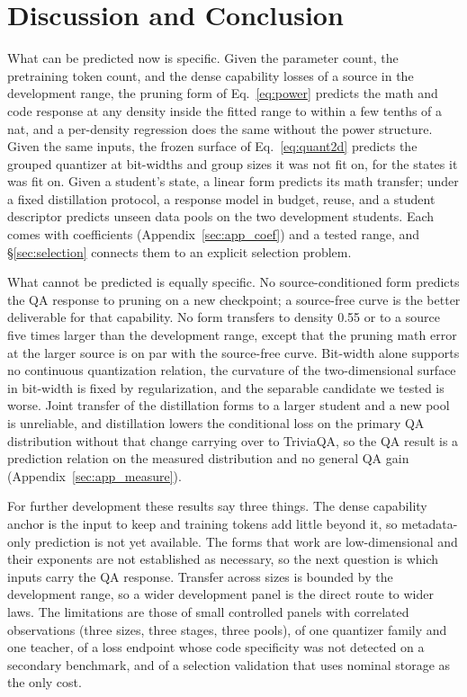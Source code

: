 \section{Discussion and Conclusion}
\label{sec:discussion}

What can be predicted now is specific. Given the parameter count, the
pretraining token count, and the dense capability losses of a source
in the development range, the pruning form of Eq.~\eqref{eq:power}
predicts the math and code response at any density inside the fitted
range to within a few tenths of a nat, and a per-density regression
does the same without the power structure. Given the same inputs, the
frozen surface of Eq.~\eqref{eq:quant2d} predicts the grouped
quantizer at bit-widths and group sizes it was not fit on, for the
states it was fit on. Given a student's state, a linear form predicts
its math transfer; under a fixed distillation protocol, a response
model in budget, reuse, and a student descriptor predicts unseen data
pools on the two development students. Each comes with coefficients
(Appendix~\ref{sec:app_coef}) and a tested range, and
\S\ref{sec:selection} connects them to an explicit selection problem.

What cannot be predicted is equally specific. No source-conditioned
form predicts the QA response to pruning on a new checkpoint; a
source-free curve is the better deliverable for that capability. No
form transfers to density 0.55 or to a source five times larger than
the development range, except that the pruning math error at the
larger source is on par with the source-free curve. Bit-width alone
supports no continuous quantization relation, the curvature of the
two-dimensional surface in bit-width is fixed by regularization, and
the separable candidate we tested is worse. Joint transfer of the
distillation forms to a larger student and a new pool is unreliable,
and distillation lowers the conditional loss on the primary QA
distribution without that change carrying over to TriviaQA, so the QA
result is a prediction relation on the measured distribution and no
general QA gain (Appendix~\ref{sec:app_measure}).

For further development these results say three things. The dense
capability anchor is the input to keep and training tokens add little
beyond it, so metadata-only prediction is not yet available. The forms
that work are low-dimensional and their exponents are not established
as necessary, so the next question is which inputs carry the QA
response. Transfer across sizes is bounded by the development range,
so a wider development panel is the direct route to wider laws. The
limitations are those of small controlled panels with correlated
observations (three sizes, three stages, three pools), of one
quantizer family and one teacher, of a loss endpoint whose code
specificity was not detected on a secondary benchmark, and of a
selection validation that uses nominal storage as the only cost.
